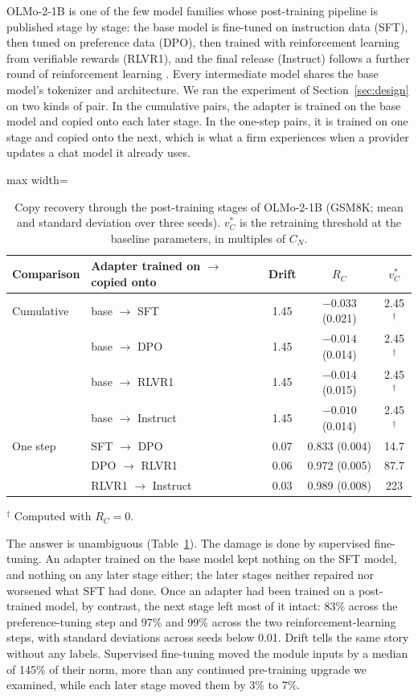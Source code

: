 \documentclass[preprint,12pt,authoryear]{elsarticle}
\begin{document}
OLMo-2-1B is one of the few model families whose post-training pipeline is published stage by stage: the base model is fine-tuned on instruction data (SFT), then tuned on preference data (DPO), then trained with reinforcement learning from verifiable rewards (RLVR1), and the final release (Instruct) follows a further round of reinforcement learning \citep{olmo2024olmo2}. Every intermediate model shares the base model's tokenizer and architecture. We ran the experiment of Section~\ref{sec:design} on two kinds of pair. In the cumulative pairs, the adapter is trained on the base model and copied onto each later stage. In the one-step pairs, it is trained on one stage and copied onto the next, which is what a firm experiences when a provider updates a chat model it already uses.

\begin{table}[t]
\centering
\caption{Copy recovery through the post-training stages of OLMo-2-1B (GSM8K; mean and standard deviation over three seeds). $v^*_C$ is the retraining threshold at the baseline parameters, in multiples of $C_N$.}\label{tab:stages}
\small
\begin{adjustbox}{max width=\textwidth}
\begin{tabular}{llccc}
\toprule
Comparison & Adapter trained on $\to$ copied onto & Drift & $R_C$ & $v^*_C$\\
\midrule
Cumulative & base $\to$ SFT & 1.45 & $-0.033$ (0.021) & 2.45$^\dagger$\\
 & base $\to$ DPO & 1.45 & $-0.014$ (0.014) & 2.45$^\dagger$\\
 & base $\to$ RLVR1 & 1.45 & $-0.014$ (0.015) & 2.45$^\dagger$\\
 & base $\to$ Instruct & 1.45 & $-0.010$ (0.014) & 2.45$^\dagger$\\
One step & SFT $\to$ DPO & 0.07 & 0.833 (0.004) & 14.7\\
 & DPO $\to$ RLVR1 & 0.06 & 0.972 (0.005) & 87.7\\
 & RLVR1 $\to$ Instruct & 0.03 & 0.989 (0.008) & 223\\
\bottomrule
\end{tabular}
\end{adjustbox}

\smallskip\footnotesize $^\dagger$ Computed with $R_C=0$.
\end{table}

The answer is unambiguous (Table~\ref{tab:stages}). The damage is done by supervised fine-tuning. An adapter trained on the base model kept nothing on the SFT model, and nothing on any later stage either; the later stages neither repaired nor worsened what SFT had done. Once an adapter had been trained on a post-trained model, by contrast, the next stage left most of it intact: 83\% across the preference-tuning step and 97\% and 99\% across the two reinforcement-learning steps, with standard deviations across seeds below 0.01. Drift tells the same story without any labels. Supervised fine-tuning moved the module inputs by a median of 145\% of their norm, more than any continued pre-training upgrade we examined, while each later stage moved them by 3\% to 7\%.
\end{document}
